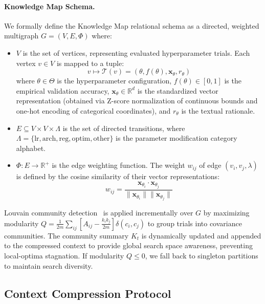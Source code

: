 \documentclass[conference]{IEEEtran}
\begin{document}
\paragraph{Knowledge Map Schema.}
We formally define the Knowledge Map relational schema as a directed, weighted multigraph $G = (V, E, \Phi)$ where:
\begin{itemize}[leftmargin=1.5em,itemsep=1pt]
    \item $V$ is the set of vertices, representing evaluated hyperparameter trials. Each vertex $v \in V$ is mapped to a tuple:
    \begin{equation}
        v \mapsto \mathcal{T}(v) = \left( \theta, f(\theta), \mathbf{x}_{\theta}, r_{\theta} \right)
    \end{equation}
    where $\theta \in \Theta$ is the hyperparameter configuration, $f(\theta) \in [0, 1]$ is the empirical validation accuracy, $\mathbf{x}_{\theta} \in \mathbb{R}^d$ is the standardized vector representation (obtained via Z-score normalization of continuous bounds and one-hot encoding of categorical coordinates), and $r_{\theta}$ is the textual rationale.
    \item $E \subseteq V \times V \times \Lambda$ is the set of directed transitions, where $\Lambda = \{ \text{lr}, \text{arch}, \text{reg}, \text{optim}, \text{other} \}$ is the parameter modification category alphabet.
    \item $\Phi: E \to \mathbb{R}^+$ is the edge weighting function. The weight $w_{ij}$ of edge $(v_i, v_j, \lambda)$ is defined by the cosine similarity of their vector representations:
    \begin{equation}
        w_{ij} = \frac{\mathbf{x}_{\theta_i} \cdot \mathbf{x}_{\theta_j}}{\|\mathbf{x}_{\theta_i}\| \|\mathbf{x}_{\theta_j}\|}
    \end{equation}
\end{itemize}
Louvain community detection~\citep{blondel2008louvain} is applied incrementally over $G$ by maximizing modularity $Q = \frac{1}{2m} \sum_{ij} \left[ A_{ij} - \frac{k_i k_j}{2m} \right] \delta(c_i, c_j)$ to group trials into covariance communities. The community summary $K_t$ is dynamically updated and appended to the compressed context to provide global search space awareness, preventing local-optima stagnation. If modularity $Q \leq 0$, we fall back to singleton partitions to maintain search diversity.


\subsection{Context Compression Protocol}
\label{sec:compression}
\end{document}
